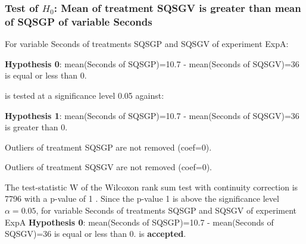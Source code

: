 \begin{frame}[t]
 \frametitle{Test of $H_{0}$: Mean of treatment SQSGV is greater than mean of SQSGP of variable Seconds }
 \scriptsize
 For variable Seconds of treatments SQSGP and SQSGV of experiment ExpA:

\vspace{1mm}
{\bf Hypothesis 0}: mean(Seconds of SQSGP)=10.7 - mean(Seconds of SQSGV)=36 is equal or less than 0.


 \begin{center} is tested at a significance level 0.05 against: \end{center}

{\bf Hypothesis 1}: mean(Seconds of SQSGP)=10.7 - mean(Seconds of SQSGV)=36 is greater than 0.
\vspace{1mm}
\vspace{1mm}

 Outliers of treatment SQSGP  are not removed (coef=0).

 Outliers of treatment SQSGV  are not removed (coef=0).
\vspace{1mm}
 
 The test-statistic W of the Wilcoxon rank sum test with continuity correction is 7796 with a p-value of 1 .
 Since the p-value 1 is above the significance level $\alpha= 0.05 $,
 for variable Seconds of treatments SQSGP and SQSGV of experiment ExpA 
 {\bf Hypothesis 0}: mean(Seconds of SQSGP)=10.7 - mean(Seconds of SQSGV)=36 is equal or less than 0.
is {\bf accepted}.

 \end{frame}
